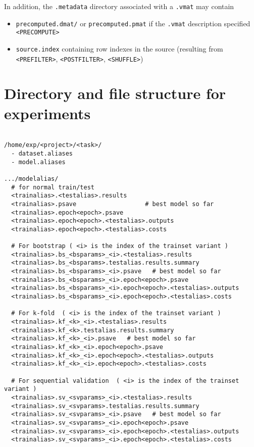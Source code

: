 \documentclass[11pt]{book}
\begin{document}
In addition, the {\tt .metadata} directory associated with a {\tt .vmat} may contain
\begin{itemize}
\item {\tt precomputed.dmat/} or {\tt precomputed.pmat} if the {\tt .vmat} description specified \verb!<PRECOMPUTE>!
\item {\tt source.index} containing row indexes in the source (resulting from \verb!<PREFILTER>!, \verb!<POSTFILTER>!, \verb!<SHUFFLE>!)
\end{itemize}

\section{Directory and file structure for experiments}

\begin{verbatim}

/home/exp/<project>/<task>/
  - dataset.aliases
  - model.aliases
   
.../modelalias/
  # for normal train/test
  <trainalias>.<testalias>.results
  <trainalias>.psave                   # best model so far
  <trainalias>.epoch<epoch>.psave
  <trainalias>.epoch<epoch>.<testalias>.outputs
  <trainalias>.epoch<epoch>.<testalias>.costs

  # For bootstrap ( <i> is the index of the trainset variant )
  <trainalias>.bs_<bsparams>_<i>.<testalias>.results
  <trainalias>.bs_<bsparams>.testalias.results.summary
  <trainalias>.bs_<bsparams>_<i>.psave   # best model so far
  <trainalias>.bs_<bsparams>_<i>.epoch<epoch>.psave
  <trainalias>.bs_<bsparams>_<i>.epoch<epoch>.<testalias>.outputs
  <trainalias>.bs_<bsparams>_<i>.epoch<epoch>.<testalias>.costs

  # For k-fold  ( <i> is the index of the trainset variant )
  <trainalias>.kf_<k>_<i>.<testalias>.results
  <trainalias>.kf_<k>.testalias.results.summary
  <trainalias>.kf_<k>_<i>.psave   # best model so far
  <trainalias>.kf_<k>_<i>.epoch<epoch>.psave
  <trainalias>.kf_<k>_<i>.epoch<epoch>.<testalias>.outputs
  <trainalias>.kf_<k>_<i>.epoch<epoch>.<testalias>.costs
  
  # For sequential validation  ( <i> is the index of the trainset variant )
  <trainalias>.sv_<svparams>_<i>.<testalias>.results
  <trainalias>.sv_<svparams>.testalias.results.summary
  <trainalias>.sv_<svparams>_<i>.psave   # best model so far
  <trainalias>.sv_<svparams>_<i>.epoch<epoch>.psave
  <trainalias>.sv_<svparams>_<i>.epoch<epoch>.<testalias>.outputs
  <trainalias>.sv_<svparams>_<i>.epoch<epoch>.<testalias>.costs
  
\end{verbatim}
\end{document}
